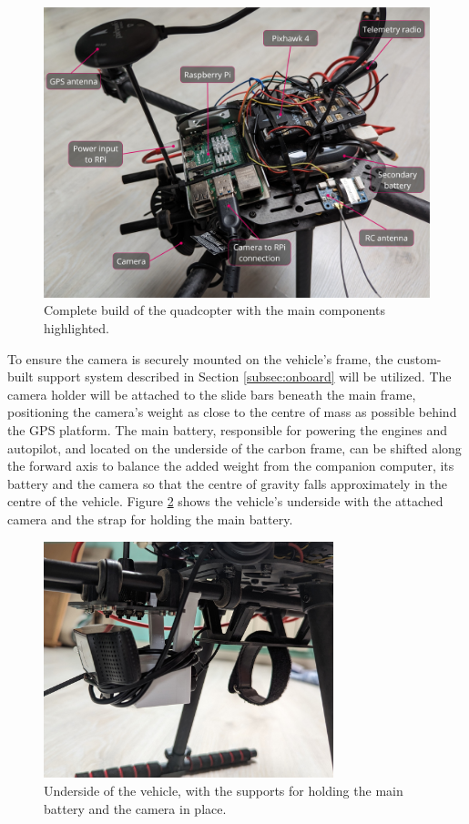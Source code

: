 \begin{figure}[H]
  \centering
  \includegraphics[width=1\textwidth, keepaspectratio]{img/full-build.jpg}
  \caption{Complete build of the quadcopter with the main components highlighted.}\label{fig:full-build}
\end{figure}


To ensure the camera is securely mounted on the vehicle's frame, the custom-built support system described in Section \ref{subsec:onboard} will be utilized. The camera holder will be attached to the slide bars beneath the main frame, positioning the camera's weight as close to the centre of mass as possible behind the GPS platform. The main battery, responsible for powering the engines and autopilot, and located on the underside of the carbon frame, can be shifted along the forward axis to balance the added weight from the companion computer, its battery and the camera so that the centre of gravity falls approximately in the centre of the vehicle. Figure \ref{fig:camera-holder-closeup} shows the vehicle's underside with the attached camera and the strap for holding the main battery.

\begin{figure}[H]
  \centering
  \includegraphics[width=0.75\textwidth, keepaspectratio]{img/underside-2.jpg}
  \caption{Underside of the vehicle, with the supports for holding the main battery and the camera in place.}
  \label{fig:camera-holder-closeup}
\end{figure}


